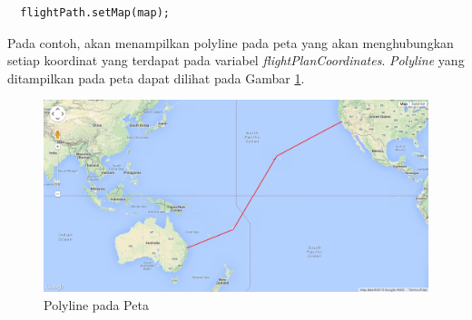 \begin{enumerate}
\begin{verbatim}
  flightPath.setMap(map);
\end{verbatim}
Pada contoh, akan menampilkan polyline pada peta yang akan menghubungkan setiap 
koordinat yang terdapat pada variabel \textit{flightPlanCoordinates}.
\textit{Polyline} yang ditampilkan pada peta dapat dilihat pada Gambar \ref{fig:polyline}.
\begin{figure}[h]
\centering
\includegraphics[scale=0.4]{Gambar/polyline}
\caption[Polyline pada Peta]{Polyline pada Peta}
\label{fig:polyline}
\end{figure}
\end{enumerate}

